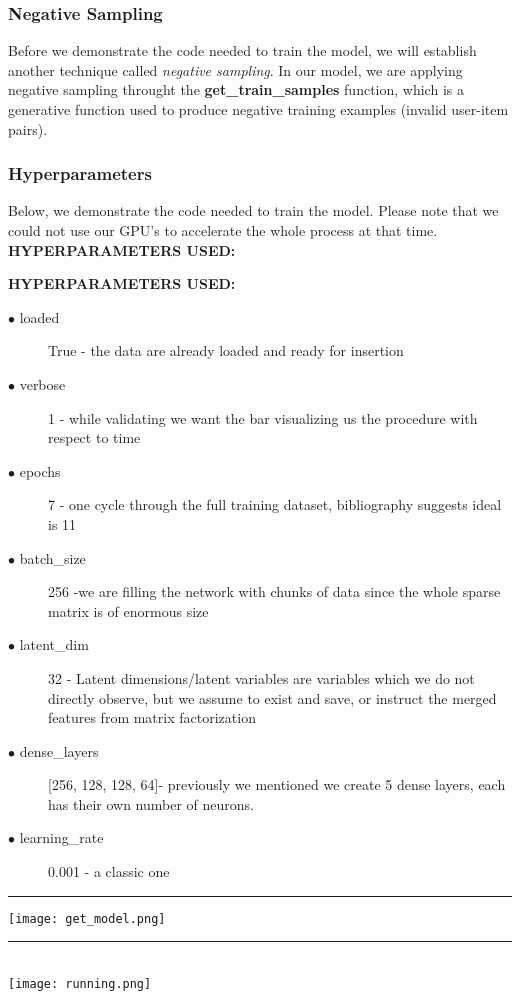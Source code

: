 \documentclass[]{article}
\begin{document}
\subsubsection{Negative Sampling}
Before we demonstrate the code needed to train the model, we will establish another technique called \textit{negative sampling}. In our model, we are applying negative sampling throught the  \textbf{get\_train\_samples} function, which is a generative function used to produce negative training examples (invalid user-item pairs).

\subsubsection{Hyperparameters}
Below, we demonstrate the code needed to train the model. Please note that we could not use our GPU's to accelerate the whole process at that time. \textbf{HYPERPARAMETERS USED:} \begin{description}\textbf{HYPERPARAMETERS USED:} \begin{description}
	\item [$\bullet$ loaded] True - the data are already loaded and ready for insertion
	\item [$\bullet$ verbose] 1 - while validating we want the bar visualizing us the procedure with respect to time
	\item [$\bullet$ epochs] 7 - one cycle through the full training dataset, bibliography suggests ideal is 11
	\item [$\bullet$ batch\_size] 256 -we are filling the network with chunks of data since the whole sparse matrix is of enormous size
	\item [$\bullet$ latent\_dim] 32 - Latent dimensions/latent variables are variables which we do not directly observe, but we assume to exist and save, or instruct the merged features from matrix factorization 
	\item [$\bullet$ dense\_layers] [256, 128, 128, 64]- previously we mentioned we create 5 dense layers, each has their own number of neurons.
	\item [$\bullet$ learning\_rate] 0.001 - a classic one
\end{description}

\noindent
{\color{Blue} \rule{\linewidth}{0.5mm}}
\texttt{[image: get\_model.png]}
\noindent
{\color{Blue} \rule{\linewidth}{0.5mm}}
\\
\texttt{[image: running.png]}

\end{description}
\end{document}
